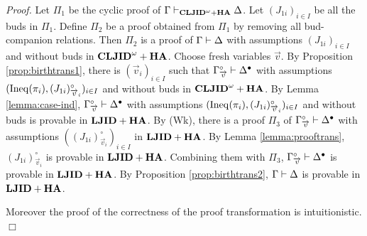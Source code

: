 {\em Proof.}
Let $\Pi_1$ be the cyclic proof of $\Gamma \mathrel \vdash_{{\bf CLJID}^\omega+{\bf HA}} \Delta$.
Let $(J_{1i})_{i \in I}$ be all the buds in $\Pi_1$.
Define $\Pi_2$ be a proof obtained from $\Pi_1$ by removing 
all bud-companion relations.
Then
$\Pi_2$ is a proof of $\Gamma \mathrel \vdash \Delta$
with assumptions $(J_{1i})_{i \in I}$ and without buds in ${{\bf CLJID}^\omega+{\bf HA}}$.
Choose fresh variables $\Vec v$.
By Proposition \ref{prop:birthtrans1}, there is $(\Vec v_i)_{i \in I}$ such that
$\Gamma^\circ_{\overrightarrow v} \mathrel \vdash \Delta^\bullet$
with assumptions $({\rm Ineq}(\pi_i),(J_{1i})^\circ_{\overrightarrow v_i})_{i \in I}$ and without buds in ${{\bf CLJID}^\omega+{\bf HA}}$.
By Lemma \ref{lemma:case-ind}, 
$\Gamma^\circ_{\overrightarrow v} \mathrel \vdash \Delta^\bullet$
with assumptions $({\rm Ineq}(\pi_i),(J_{1i})^\circ_{\overrightarrow v_i})_{i \in I}$ and without buds is provable in ${{\bf LJID}+{\bf HA}}$.
By (Wk),
there is a proof $\Pi_3$ of $\Gamma^\circ_{\overrightarrow v} \mathrel \vdash \Delta^\bullet$
with assumptions $((J_{1i})^\circ_{\Vec v_i})_{i \in I}$ in ${{\bf LJID}+{\bf HA}}$.
By Lemma \ref{lemma:prooftrans},
$(J_{1i})^\circ_{\Vec v_i}$ is provable in ${{\bf LJID}+{\bf HA}}$.
Combining them with $\Pi_3$,
$\Gamma^\circ_{\overrightarrow v} \mathrel \vdash \Delta^\bullet$ is provable in ${{\bf LJID}+{\bf HA}}$.
By Proposition \ref{prop:birthtrans2},
$\Gamma \mathrel \vdash \Delta$ is provable in ${{\bf LJID}+{\bf HA}}$.

Moreover the proof of the correctness of the proof transformation is
intuitionistic.
$\Box$
